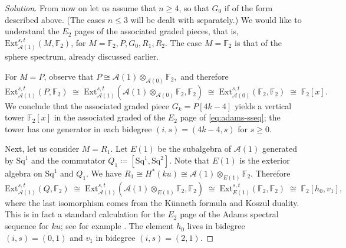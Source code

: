 \documentclass{amsart}
\newcommand{\Ext}{\mathrm{Ext}}
\newcommand{\Steenrod}{\mathcal{A}}
\newcommand{\Aone}{\Steenrod(1)}
\newcommand{\Azero}{\Steenrod(0)}
\newcommand{\FF}{\mathbb{F}}
\newcommand{\Sq}{\mathrm{Sq}}
\newcommand{\defeq}{\coloneqq}
\begin{document}
\begin{proof}[Solution]
From now on let us assume that $n \geq 4$, so that $G_0$ if of the
form described above. (The cases $n \leq 3$ will be dealt with
separately.) We would like to understand the $E_2$ pages of the
associated graded pieces, that is, $\Ext_{\Aone}^{s, t}(M, \FF_2)$,
for $M = \FF_2, P, G_0, R_1, R_2.$ The case $M=\FF_2$ is that of the
sphere spectrum, already discussed earlier.

For $M=P$, observe that $P \cong \Aone \otimes_{\Azero} \FF_2,$
and therefore
\[
  \Ext_{\Aone}^{s, t}(P, \FF_2) \; \cong  \; \Ext_{\Aone}^{s, t}( \Aone \otimes_{\Azero} \FF_2, \FF_2)   \;\cong  \; \Ext_{\Azero}^{s, t}(\FF_2, \FF_2) \;  \cong  \; \FF_2[x].
\]
We conclude that the associated graded piece $G_k=P[4k-4]$ yields a vertical tower $\FF_2[x]$ in the associated graded of the $E_2$ page of \eqref{eq:adams-sseq}; the tower has one generator in each bidegree $(i, s)=(4k-4, s)$ for $s \geq 0$.

Next, let us consider $M=R_1$. Let $E(1)$ be the subalgebra of $\Aone$ generated by $\Sq^1$ and the commutator $Q_1\defeq[\Sq^1, \Sq^2]$. Note that $E(1)$ is the exterior algebra on $\Sq^1$ and $Q_1$. We have
$ R_1 \cong H^*(ku) \cong  \Aone \otimes_{E(1)} \FF_2.$
Therefore
\[
  \Ext_{\Aone}^{s, t}(Q, \FF_2) \; \cong  \; \Ext_{\Aone}^{s, t}( \Aone \otimes_{E(1)} \FF_2, \FF_2)   \;\cong  \; \Ext_{E(1)}^{s, t}(\FF_2, \FF_2)  \;  \cong  \; \FF_2[h_0, v_1],
\]
where the last isomorphism comes from the K\"unneth formula and Koszul duality. This is in fact a standard calculation for the $E_2$ page of the Adams spectral sequence for $ku$; see for example \cite[Proposition 6.28]{RognesNotes}. The element $h_0$ lives in bidegree $(i, s)=(0,1)$ and $v_1$ in bidegree $(i, s)=(2,1)$.


\end{proof}
\end{document}
